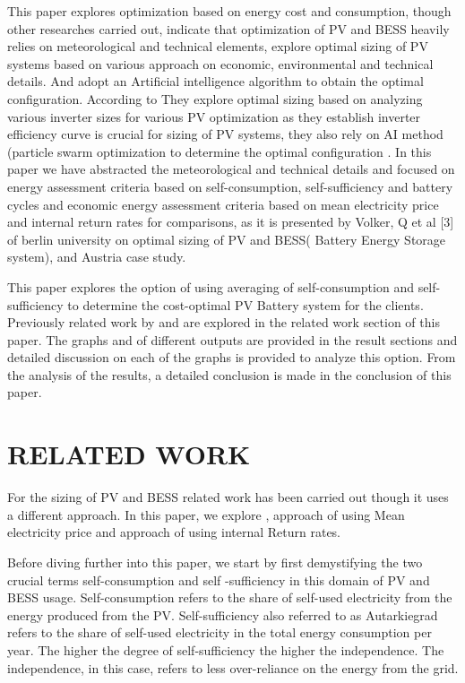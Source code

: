 \documentclass[sigconf,12pt,nonacm]{acmart}
\begin{document}
This paper explores optimization based on energy cost and consumption, though other researches carried out, indicate that optimization of PV and BESS heavily relies on meteorological and technical elements, \citeauthor{khatib_2013_a}  explore optimal sizing of PV systems based on various approach on economic, environmental and technical details\cite{khatib_2013_a}. And adopt an Artificial intelligence algorithm to obtain the optimal configuration. According to  \citeauthor{notton_2010_optimal} They explore optimal sizing based on analyzing various inverter sizes for various PV optimization as they establish inverter efficiency curve is crucial for sizing of PV systems, they also rely on AI method (particle swarm optimization to determine the optimal configuration \cite{notton_2010_optimal}. In this paper we have abstracted the meteorological and technical details and focused on energy assessment criteria based on self-consumption, self-sufficiency and battery cycles and economic energy assessment criteria based on mean electricity price and internal return rates for comparisons,  as it is presented by Volker, Q et al [3]\citeauthor{weniger_2014_sizing} of berlin university on optimal sizing of PV and BESS( Battery Energy Storage system)\cite{weniger_2014_sizing}, and \citeauthor{hartner_2017_optimal} Austria case study.\cite{hartner_2017_optimal}

This paper explores the option of using averaging of self-consumption and self-sufficiency to determine the cost-optimal PV Battery system for the clients. Previously related work by \citeauthor{weniger_2014_sizing} \cite{weniger_2014_sizing} and \citeauthor{hartner_2017_optimal} \cite{hartner_2017_optimal}  are explored in the related work section of this paper. The graphs and of different outputs are provided in the result sections and detailed discussion on each of the graphs is provided to analyze this option. From the analysis of the results, a detailed conclusion is made in the conclusion of this paper.
\section{RELATED WORK}
For the sizing of PV and BESS related work has been carried out though it uses a different approach. In this paper, we explore \citeauthor{weniger_2014_sizing}, approach of using Mean electricity price and \citeauthor{hartner_2017_optimal} approach of using internal Return rates. 

Before diving further into this paper, we start by first demystifying the two crucial terms self-consumption\cite{butzner_2017_der} and self -sufficiency\cite{butzner_2017_der} in this domain of PV and BESS usage. Self-consumption\cite{butzner_2017_der} refers to the share of self-used electricity from the energy produced from the PV. Self-sufficiency\cite{butzner_2017_der} also referred to as Autarkiegrad refers to the share of self-used electricity in the total energy consumption per year. The higher the degree of self-sufficiency the higher the independence\cite{quaschning_2013_optimale}. The independence, in this case, refers to less over-reliance on the energy from the grid.
\end{document}
